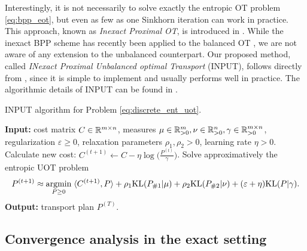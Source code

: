 Interestingly, it is not necessarily to solve exactly the entropic OT problem \eqref{eq:bpp_eot},
but even as few as one Sinkhorn iteration can work in practice.
This approach, known as \textit{Inexact Proximal OT}, is introduced in \citep{Xie20}.
While the inexact BPP scheme has recently been applied to the balanced OT \citep{Xie20,Yang22},
we are not aware of any extension to the unbalanced counterpart.
Our proposed method, called \textit{INexact Proximal Unbalanced optimal Transport} (INPUT),
follows directly from \citep{Xie20}, since it is simple to implement and
usually performs well in practice. The algorithmic details of INPUT can be found in .
\begin{algorithm}[t]
  \caption{INPUT algorithm for Problem \eqref{eq:discrete_ent_uot}.}
  \label{alg:isppa}
\begin{algorithmic}[1]
  \STATE \textbf{Input:} cost matrix $C \in \mathbb R^{m \times n}$,
  measures $\mu \in \mathbb R^m_{> 0}, \nu \in \mathbb R^n_{> 0}, \gamma \in \mathbb R^{m \times n}_{> 0}$,
  regularization $\varepsilon \geq 0$, relaxation parameters $\rho_1, \rho_2 > 0$,
  learning rate $\eta > 0$.
  \STATE Calculate new cost: $C^{(t+1)} \gets C - \eta \log \Big( \frac{P^{(t)}}{\gamma} \Big)$.
  \STATE Solve approximatively the entropic UOT problem
  \begin{align}
    P^{(t+1)} \approx \operatorname*{argmin}_{P \geq 0} \; \langle C^{(t+1)}, P \rangle +
    \rho_1 \text{KL}(P_{\# 1} | \mu) + \rho_2 \text{KL}(P_{\# 2} | \nu) + (\varepsilon + \eta) \text{KL}(P | \gamma).
  \end{align}
  \ENDFOR
  \STATE \textbf{Output:} transport plan $P^{(T)}$.
\end{algorithmic}
\end{algorithm}

\subsection{Convergence analysis in the exact setting}

